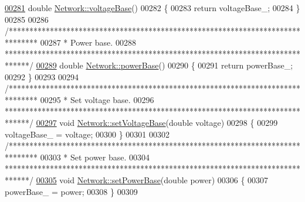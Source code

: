 \begin{DoxyCode}
\hypertarget{network_8cpp_source_l00281}{}\hyperlink{group___models_ga88cd2506aaf0b19513e41f00608093e0}{00281} \textcolor{keywordtype}{double} \hyperlink{group___models_ga88cd2506aaf0b19513e41f00608093e0}{Network::voltageBase}()
00282 \{
00283   \textcolor{keywordflow}{return} voltageBase\_;
00284 \}
00285 
00286 \textcolor{comment}{/*******************************************************************************}
00287 \textcolor{comment}{ * Power base.}
00288 \textcolor{comment}{ ******************************************************************************/}
\hypertarget{network_8cpp_source_l00289}{}\hyperlink{group___models_ga6fdbd7d04d12a3f1215c92e2e20eabdb}{00289} \textcolor{keywordtype}{double} \hyperlink{group___models_ga6fdbd7d04d12a3f1215c92e2e20eabdb}{Network::powerBase}()
00290 \{
00291   \textcolor{keywordflow}{return} powerBase\_;
00292 \}
00293 
00294 \textcolor{comment}{/*******************************************************************************}
00295 \textcolor{comment}{ * Set voltage base.}
00296 \textcolor{comment}{ ******************************************************************************/}
\hypertarget{network_8cpp_source_l00297}{}\hyperlink{group___models_gac2787bb9c323716baa2e6fba06136f2b}{00297} \textcolor{keywordtype}{void} \hyperlink{group___models_gac2787bb9c323716baa2e6fba06136f2b}{Network::setVoltageBase}(\textcolor{keywordtype}{double} voltage)
00298 \{
00299   voltageBase\_ = voltage;
00300 \}
00301 
00302 \textcolor{comment}{/*******************************************************************************}
00303 \textcolor{comment}{ * Set power base.}
00304 \textcolor{comment}{ ******************************************************************************/}
\hypertarget{network_8cpp_source_l00305}{}\hyperlink{group___models_ga3ba9ef05ea0c5037a415cfab25d03a0d}{00305} \textcolor{keywordtype}{void} \hyperlink{group___models_ga3ba9ef05ea0c5037a415cfab25d03a0d}{Network::setPowerBase}(\textcolor{keywordtype}{double} power)
00306 \{
00307   powerBase\_ = power;
00308 \}
00309 
\end{DoxyCode}
